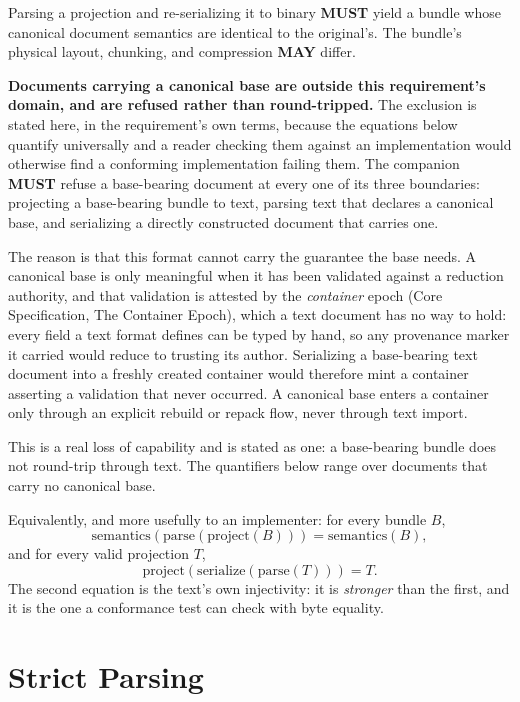 \documentclass[11pt,letterpaper]{report}
\newcommand{\sectionsc}[1]{{\addfontfeatures{Letters=SmallCaps}#1}}
\newcounter{requirement}[chapter]
\newcommand{\MUST}{\textbf{MUST}}
\newcommand{\MAY}{\textbf{MAY}}
\begin{document}
\begin{requirement}
  \label{req:textproj:roundtrip}
  Parsing a projection and re-serializing it to binary \MUST{} yield a bundle
  whose canonical document semantics are identical to the original's. The
  bundle's physical layout, chunking, and compression \MAY{} differ.

  \textbf{Documents carrying a canonical base are outside this requirement's
  domain, and are refused rather than round-tripped.} The exclusion is stated
  here, in the requirement's own terms, because the equations below quantify
  universally and a reader checking them against an implementation would
  otherwise find a conforming implementation failing them. The companion
  \MUST{} refuse a base-bearing document at every one of its three boundaries:
  projecting a base-bearing bundle to text, parsing text that declares a
  canonical base, and serializing a directly constructed document that carries
  one.

  The reason is that this format cannot carry the guarantee the base needs. A
  canonical base is only meaningful when it has been validated against a
  reduction authority, and that validation is attested by the \emph{container}
  epoch (Core Specification, \sectionsc{The Container Epoch}), which a text
  document has no way to hold: every field a text format defines can be typed
  by hand, so any provenance marker it carried would reduce to trusting its
  author. Serializing a base-bearing text document into a freshly created
  container would therefore mint a container asserting a validation that never
  occurred. A canonical base enters a container only through an explicit
  rebuild or repack flow, never through text import.

  This is a real loss of capability and is stated as one: a base-bearing bundle
  does not round-trip through text. The quantifiers below range over documents
  that carry no canonical base.

  Equivalently, and more usefully to an implementer: for every bundle $B$,
  \[
    \textrm{semantics}(\textrm{parse}(\textrm{project}(B))) =
    \textrm{semantics}(B),
  \]
  and for every valid projection $T$,
  \[
    \textrm{project}(\textrm{serialize}(\textrm{parse}(T))) = T .
  \]
  The second equation is the text's own injectivity: it is \emph{stronger} than
  the first, and it is the one a conformance test can check with byte equality.
\end{requirement}

\section{Strict Parsing}
\end{document}
